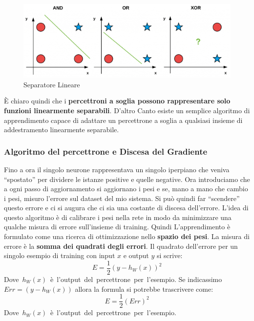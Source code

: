 \begin{figure}[h!]
	\centering
	\includegraphics[width=1\textwidth]{bitwise_datasets-1024x365.png}
	\caption{Separatore Lineare}
	\label{SeparatoreLineare}
\end{figure}
È chiaro quindi che i \textbf{percettroni a soglia possono rappresentare solo funzioni linearmente separabili}. D'altro Canto esiste un semplice algoritmo di apprendimento capace di adattare un percettrone a soglia a qualsiasi insieme di addestramento linearmente separabile.
\subsubsection{Algoritmo del percettrone e Discesa del Gradiente}
Fino a ora il singolo neurone rappresentava un singolo iperpiano che veniva ``spostato'' per dividere le istanze positive e quelle negative. Ora introduciamo che a ogni passo di aggiornamento si aggiornano i pesi e se, mano a mano che cambio i pesi, misuro l'errore sul dataset del mio sistema. Si può quindi far ``scendere'' questo errore e ci si augura che ci sia una costante di discesa dell'errore. L'idea di questo algoritmo è di calibrare i pesi nella rete in modo da minimizzare una qualche misura di errore sull'insieme di training. Quindi L'apprendimento è formulato come una ricerca di ottimizzazione nello \textbf{spazio dei pesi}. La misura di errore è la \textbf{somma dei quadrati degli errori}.
Il quadrato dell'errore per un singolo esempio di training con input $x$ e output $y$ si scrive:
\[E=\frac{1}{2}(y-h_W(x))^2\]\mbox{Dove $h_W(x)$ è l'output del percettrone per l'esempio.}
Se indicassimo $Err = (y-h_W(x))$ allora la formula si potrebbe trascrivere come:
\[E=\frac{1}{2}(Err)^2\]\mbox{Dove $h_W(x)$ è l'output del percettrone per l'esempio.}


